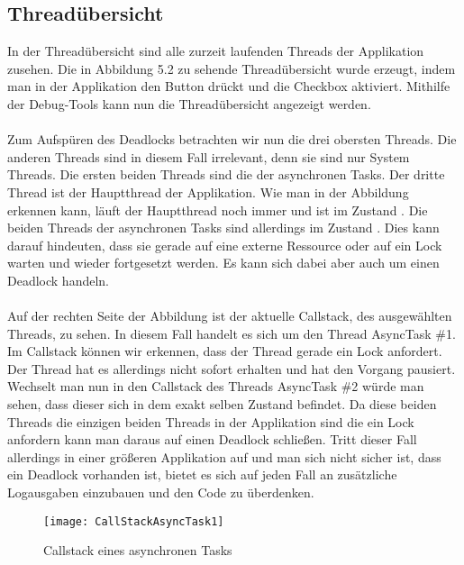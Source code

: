 \subsection{Threadübersicht}
In der Threadübersicht sind alle zurzeit laufenden Threads der Applikation zusehen. Die in Abbildung 5.2 zu sehende Threadübersicht wurde erzeugt, indem man in der Applikation den Button  drückt und die Checkbox  aktiviert. Mithilfe der Debug-Tools kann nun die Threadübersicht angezeigt werden.
\\
\\
Zum Aufspüren des Deadlocks betrachten wir nun die drei obersten Threads. Die anderen Threads sind in diesem Fall irrelevant, denn sie sind nur System Threads. Die ersten beiden Threads sind die der asynchronen Tasks. Der dritte Thread ist der Hauptthread der Applikation. Wie man in der Abbildung erkennen kann, läuft der Hauptthread noch immer und ist im Zustand . Die beiden Threads der asynchronen Tasks sind allerdings im Zustand . Dies kann darauf hindeuten, dass sie gerade auf eine externe Ressource oder auf ein Lock warten und wieder fortgesetzt werden. Es kann sich dabei aber auch um einen Deadlock handeln.
\\
\\
Auf der rechten Seite der Abbildung ist der aktuelle Callstack, des ausgewählten Threads, zu sehen. In diesem Fall handelt es sich um den Thread AsyncTask \#1. Im Callstack können wir erkennen, dass der Thread gerade ein Lock anfordert. Der Thread hat es allerdings nicht sofort erhalten und hat den Vorgang pausiert. Wechselt man nun in den Callstack des Threads AsyncTask \#2 würde man sehen, dass dieser sich in dem exakt selben Zustand befindet. Da diese beiden Threads die einzigen beiden Threads in der Applikation sind die ein Lock anfordern kann man daraus auf einen Deadlock schließen. Tritt dieser Fall allerdings in einer größeren Applikation auf und man sich nicht sicher ist, dass ein Deadlock vorhanden ist, bietet es sich auf jeden Fall an zusätzliche Logausgaben einzubauen und den Code zu überdenken.

\begin{figure}
\centering
\texttt{[image: CallStackAsyncTask1]}
\caption{Callstack eines asynchronen Tasks}
\label{fig:CallStackAsyncTask1}
\end{figure}

